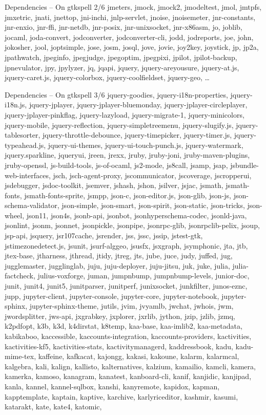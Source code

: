 \documentclass{beamer}
\begin{document}
\begin{frame}{Dependencies – On gtkspell 2/6}
jmeters, jmock, jmock2, jmodeltest, jmol, jmtpfs, jmxetric, jnati, jnettop, jni-inchi, jnlp-servlet, jnoise, jnoisemeter, jnr-constants, jnr-enxio, jnr-ffi, jnr-netdb, jnr-posix, jnr-unixsocket, jnr-x86asm, jo, joblib, jocaml, joda-convert, jodconverter, jodconverter-cli, jodd, jodreports, joe, john, jokosher, jool, joptsimple, jose, josm, josql, jove, jovie, joy2key, joystick, jp, jp2a, jpathwatch, jpeginfo, jpegjudge, jpegoptim, jpegpixi, jpilot, jpilot-backup, jpnevulator, jpy, jpylyzer, jq, jqapi, jquery, jquery-areyousure, jquery-at.js, jquery-caret.js, jquery-colorbox, jquery-coolfieldset, jquery-geo, …
\end{frame}

\begin{frame}{Dependencies – On gtkspell 3/6}
\tiny jquery-goodies, jquery-i18n-properties, jquery-i18n.js, jquery-jplayer, jquery-jplayer-bluemonday, jquery-jplayer-circleplayer, jquery-jplayer-pinkflag, jquery-lazyload, jquery-migrate-1, jquery-minicolors, jquery-mobile, jquery-reflection, jquery-simpletreemenu, jquery-slugify.js, jquery-tablesorter, jquery-throttle-debounce, jquery-timepicker, jquery-timer.js, jquery-typeahead.js, jquery-ui-themes, jquery-ui-touch-punch.js, jquery-watermark, jquery.sparkline, jqueryui, jreen, jrexx, jruby, jruby-joni, jruby-maven-plugins, jruby-openssl, js-build-tools, js-of-ocaml, js2-mode, js8call, jsamp, jsap, jsbundle-web-interfaces, jsch, jsch-agent-proxy, jscommunicator, jscoverage, jscropperui, jsdebugger, jsdoc-toolkit, jsemver, jshash, jshon, jsilver, jsjac, jsmath, jsmath-fonts, jsmath-fonts-sprite, jsmpp, json-c, json-editor.js, json-glib, json-js, json-schema-validator, json-simple, json-smart, json-spirit, json-static, json-tricks, json-wheel, json11, json4s, jsonb-api, jsonbot, jsonhyperschema-codec, jsonld-java, jsonlint, jsonm, jsonnet, jsonpickle, jsonpipe, jsonrpc-glib, jsonrpclib-pelix, jsoup, jsp-api, jsquery, jsr107cache, jsrender, jss, jssc, jssip, jstest-gtk, jstimezonedetect.js, jsunit, jsurf-alggeo, jsusfx, jsxgraph, jsymphonic, jta, jtb, jtex-base, jtharness, jthread, jtidy, jtreg, jts, jube, juce, judy, juffed, jug, jugglemaster, jugglinglab, juju, juju-deployer, juju-jitsu, juk, juke, julia, julia-factcheck, julius-voxforge, juman, jumpnbump, jumpnbump-levels, junior-doc, junit, junit4, junit5, junitparser, junitperf, junixsocket, junkfilter, junos-eznc, jupp, jupyter-client, jupyter-console, jupyter-core, jupyter-notebook, jupyter-sphinx, jupyter-sphinx-theme, jutils, jvim, jvyamlb, jwchat, jwhois, jwm, jwordsplitter, jws-api, jxgrabkey, jxplorer, jxrlib, jython, jzip, jzlib, jzmq, k2pdfopt, k3b, k3d, k4dirstat, k8temp, kaa-base, kaa-imlib2, kaa-metadata, kabikaboo, kaccessible, kaccounts-integration, kaccounts-providers, kactivities, kactivities-kf5, kactivities-stats, kactivitymanagerd, kaddressbook, kadu, kadu-mime-tex, kaffeine, kafkacat, kajongg, kakasi, kakoune, kalarm, kalarmcal, kalgebra, kali, kalign, kallisto, kalternatives, kalzium, kamailio, kamcli, kamera, kamerka, kamoso, kanagram, kanatest, kanboard-cli, kanif, kanjidic, kanjipad, kanla, kannel, kannel-sqlbox, kanshi, kanyremote, kapidox, kapman, kapptemplate, kaptain, kaptive, karchive, karlyriceditor, kashmir, kasumi, katarakt, kate, kate4, katomic, 
\end{frame}
\end{document}
